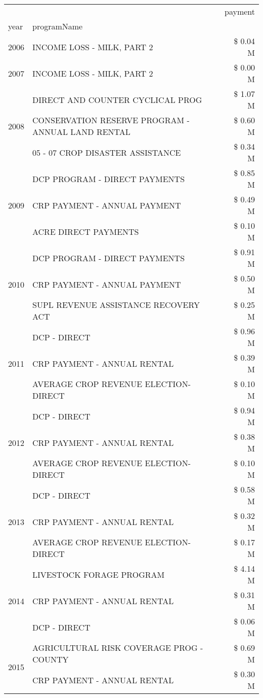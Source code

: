 \begin{tabular}{llr}
\toprule
 &  & payment \\
year & programName &  \\
\midrule
2006 & INCOME LOSS - MILK, PART 2 & \$ 0.04 M \\
\cline{1-3}
2007 & INCOME LOSS - MILK, PART 2 & \$ 0.00 M \\
\cline{1-3}
\multirow[t]{3}{*}{2008} & DIRECT AND COUNTER CYCLICAL PROG & \$ 1.07 M \\
 & CONSERVATION RESERVE PROGRAM - ANNUAL LAND RENTAL & \$ 0.60 M \\
 & 05 - 07 CROP DISASTER ASSISTANCE & \$ 0.34 M \\
\cline{1-3}
\multirow[t]{3}{*}{2009} & DCP PROGRAM - DIRECT PAYMENTS & \$ 0.85 M \\
 & CRP PAYMENT - ANNUAL PAYMENT & \$ 0.49 M \\
 & ACRE DIRECT PAYMENTS & \$ 0.10 M \\
\cline{1-3}
\multirow[t]{3}{*}{2010} & DCP PROGRAM - DIRECT PAYMENTS & \$ 0.91 M \\
 & CRP PAYMENT - ANNUAL PAYMENT & \$ 0.50 M \\
 & SUPL REVENUE ASSISTANCE RECOVERY ACT & \$ 0.25 M \\
\cline{1-3}
\multirow[t]{3}{*}{2011} & DCP - DIRECT & \$ 0.96 M \\
 & CRP PAYMENT - ANNUAL RENTAL & \$ 0.39 M \\
 & AVERAGE CROP REVENUE ELECTION-DIRECT & \$ 0.10 M \\
\cline{1-3}
\multirow[t]{3}{*}{2012} & DCP - DIRECT & \$ 0.94 M \\
 & CRP PAYMENT - ANNUAL RENTAL & \$ 0.38 M \\
 & AVERAGE CROP REVENUE ELECTION-DIRECT & \$ 0.10 M \\
\cline{1-3}
\multirow[t]{3}{*}{2013} & DCP - DIRECT & \$ 0.58 M \\
 & CRP PAYMENT - ANNUAL RENTAL & \$ 0.32 M \\
 & AVERAGE CROP REVENUE ELECTION-DIRECT & \$ 0.17 M \\
\cline{1-3}
\multirow[t]{3}{*}{2014} & LIVESTOCK FORAGE PROGRAM & \$ 4.14 M \\
 & CRP PAYMENT - ANNUAL RENTAL & \$ 0.31 M \\
 & DCP - DIRECT & \$ 0.06 M \\
\cline{1-3}
\multirow[t]{3}{*}{2015} & AGRICULTURAL RISK COVERAGE PROG - COUNTY & \$ 0.69 M \\
 & CRP PAYMENT - ANNUAL RENTAL & \$ 0.30 M \\

\end{tabular}
